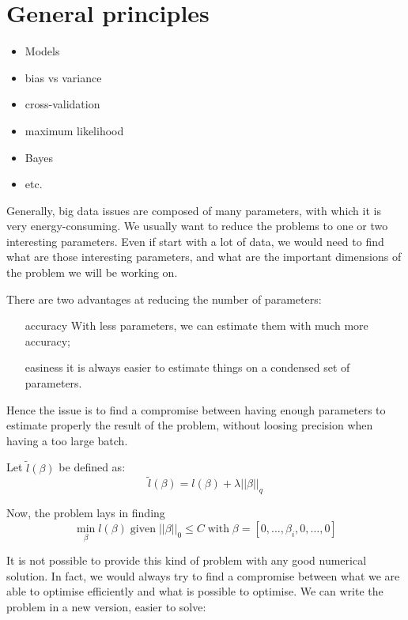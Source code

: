 \chapter{General principles}
\label{ch:general-principles}

\begin{itemize}
    \item Models
    \item bias vs variance
    \item cross-validation
    \item maximum likelihood
    \item Bayes
    \item etc.
\end{itemize}


Generally, big data issues are composed of many parameters, with which it is
very energy-consuming. We usually want to reduce the problems to one or two
interesting parameters. Even if start with a lot of data, we would need to find
what are those interesting parameters, and what are the important dimensions of
the problem we will be working on.

There are two advantages at reducing the number of parameters:
\begin{itemize}
    \item[accuracy] With less parameters, we can estimate them with much more
        accuracy;
    \item[easiness] it is always easier to estimate things on a condensed set
        of parameters.
\end{itemize}

Hence the issue is to find a compromise between having enough parameters to
estimate properly the result of the problem, without loosing precision when
having a too large batch.


Let $\tilde{l}(\beta)$ be defined as:
\begin{equation}
    \tilde{l}(\beta) = l(\beta) + \lambda ||\beta||_q
\end{equation}

Now, the problem lays in finding
\begin{equation}
    \min_\beta l(\beta) \; \text{given} \; ||\beta||_0 \leq C
    \; \text{with} \; \beta = [0, \ldots, \beta_i, 0, \ldots, 0]
\end{equation}

It is not possible to provide this kind of problem with any good numerical
solution. In fact, we would always try to find a compromise between what we are able to optimise efficiently and what is possible to optimise. We can
write the problem in a new version, easier to solve:

